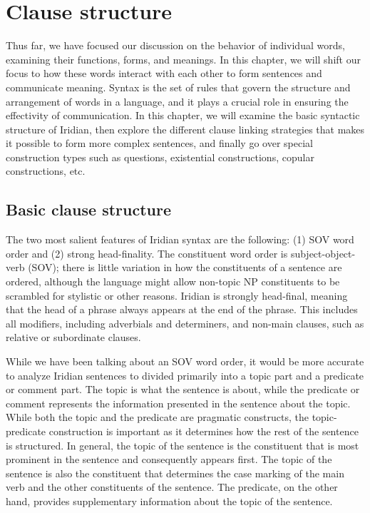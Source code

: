 \chapter{Clause structure}\label{chap:clause-structure}

Thus far, we have focused our discussion on the behavior of individual words,
examining their functions, forms, and meanings. In this chapter, we will shift
our focus to how these words interact with each other to form sentences and
communicate meaning. Syntax is the set of rules that govern the structure and
arrangement of words in a language, and it plays a crucial role in ensuring the
effectivity of communication. In this chapter, we will examine the basic
syntactic structure of Iridian, then explore the different clause linking
strategies that makes it possible to form more complex sentences, and finally go
over special construction types such as questions, existential constructions,
copular constructions, etc.

\section{Basic clause structure}\label{sec:basic-clause-structure}

The two most salient features of Iridian syntax are the following: (1) SOV word
order and (2) strong head-finality. The constituent word order is
subject-object-verb (SOV); there is little variation in how the constituents of
a sentence are ordered, although the language might allow non-topic NP
constituents to be scrambled for stylistic or other reasons. Iridian is strongly
head-final, meaning that the head of a phrase always appears at the end of the
phrase. This includes all modifiers, including adverbials and determiners, and
non-main clauses, such as relative or subordinate clauses.

While we have been talking about an SOV word order, it would be more accurate to
analyze Iridian sentences to divided primarily into a topic part and a predicate
or comment part. The topic is what the sentence is about, while the predicate or
comment represents the information presented in the sentence about the topic.
While both the topic and the predicate are pragmatic constructs, the
topic-predicate construction is important as it determines how the rest of the
sentence is structured. In general, the topic of the sentence is the constituent
that is most prominent in the sentence and consequently appears first. The topic
of the sentence is also the constituent that determines the case marking of the
main verb and the other constituents of the sentence. The predicate, on the
other hand, provides supplementary information about the topic of the sentence.

